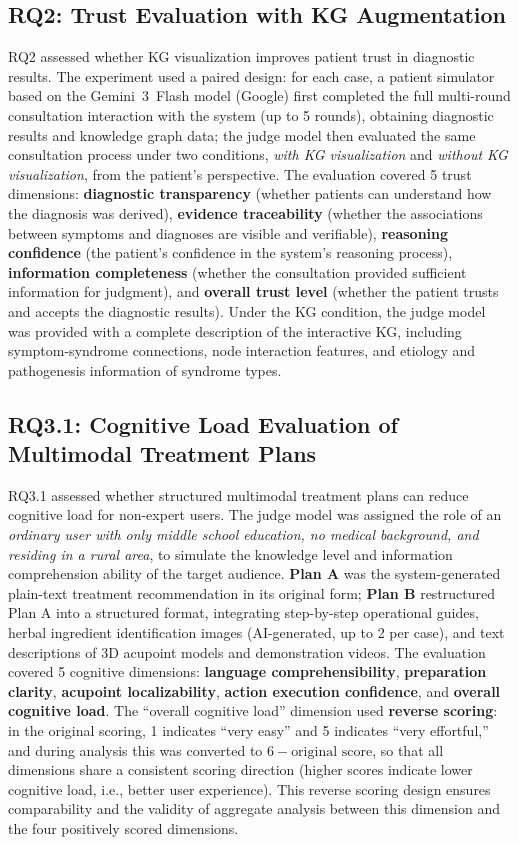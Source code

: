 \documentclass[12pt]{article}
\begin{document}
\subsection{RQ2: Trust Evaluation with KG Augmentation}

RQ2 assessed whether KG visualization improves patient trust in diagnostic results.
The experiment used a paired design: for each case, a patient simulator based on the Gemini~3~Flash model (Google) first completed the full multi-round consultation interaction with the system (up to 5 rounds),
obtaining diagnostic results and knowledge graph data;
the judge model then evaluated the same consultation process under two conditions, \textit{with KG visualization} and \textit{without KG visualization},
from the patient's perspective.
The evaluation covered 5 trust dimensions: \textbf{diagnostic transparency} (whether patients can understand how the diagnosis was derived),
\textbf{evidence traceability} (whether the associations between symptoms and diagnoses are visible and verifiable),
\textbf{reasoning confidence} (the patient's confidence in the system's reasoning process),
\textbf{information completeness} (whether the consultation provided sufficient information for judgment), and
\textbf{overall trust level} (whether the patient trusts and accepts the diagnostic results).
Under the KG condition, the judge model was provided with a complete description of the interactive KG,
including symptom-syndrome connections, node interaction features, and etiology and pathogenesis information of syndrome types.

\subsection{RQ3.1: Cognitive Load Evaluation of Multimodal Treatment Plans}

RQ3.1 assessed whether structured multimodal treatment plans can reduce cognitive load for non-expert users.
The judge model was assigned the role of an \textit{ordinary user with only middle school education, no medical background, and residing in a rural area},
to simulate the knowledge level and information comprehension ability of the target audience.
\textbf{Plan A} was the system-generated plain-text treatment recommendation in its original form;
\textbf{Plan B} restructured Plan A into a structured format,
integrating step-by-step operational guides, herbal ingredient identification images (AI-generated, up to 2 per case),
and text descriptions of 3D acupoint models and demonstration videos.
The evaluation covered 5 cognitive dimensions: \textbf{language comprehensibility}, \textbf{preparation clarity},
\textbf{acupoint localizability}, \textbf{action execution confidence}, and \textbf{overall cognitive load}.
The ``overall cognitive load'' dimension used \textbf{reverse scoring}:
in the original scoring, 1 indicates ``very easy'' and 5 indicates ``very effortful,''
and during analysis this was converted to $6 - \text{original score}$,
so that all dimensions share a consistent scoring direction (higher scores indicate lower cognitive load, i.e., better user experience).
This reverse scoring design ensures comparability and the validity of aggregate analysis between this dimension and the four positively scored dimensions.
\end{document}
